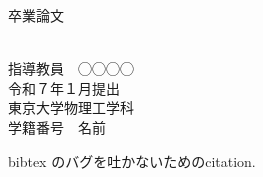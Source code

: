 \documentclass[uplatex,dvipdfmx,a4paper,12pt,12ptj]{jsreport}
\begin{document}
\thispagestyle{empty}
\begin{center}

\vspace{20mm}
{\huge\noindent 卒業論文}\\
\vspace{20mm}
{\huge{}}\\
\medskip
\vspace{20mm}

{\Large\noindent
指導教員　◯◯◯◯    \\
\vspace{\baselineskip}
\vspace{30mm}
{令和７年１月提出}\\
\vspace{20mm}
\hfill 東京大学物理工学科 \\
\hfill 学籍番号　名前\\
}
\vspace{40mm}

\end{center}


\tableofcontents







\cite{yaoChargeTransferEffects2018}bibtex のバグを吐かないためのcitation.


% 
% 
\printbibliography
\end{document}
